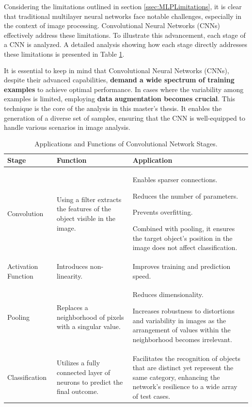 Considering the limitations outlined in section \ref{ssec:MLPLimitations}, it is clear that traditional multilayer neural networks face notable challenges, especially in the context of image processing. Convolutional Neural Networks (CNNs) effectively address these limitations. To illustrate this advancement, each stage of a CNN is analyzed. A detailed analysis showing how each stage directly addresses these limitations is presented in Table \ref{tab:CNNStages}.

It is essential to keep in mind that Convolutional Neural Networks (CNNs), despite their advanced capabilities, \textbf{demand a wide spectrum of training examples} to achieve optimal performance. In cases where the variability among examples is limited, employing \textbf{data augmentation becomes crucial}. This technique is the core of the analysis in this master's thesis. It enables the generation of a diverse set of samples, ensuring that the CNN is well-equipped to handle various scenarios in image analysis.

\begin{table}[H]
    
    \caption{Applications and Functions of Convolutional Network Stages.}
    \centering
    \begin{tabular}{|>{\centering\arraybackslash}m{4cm}|>{\centering\arraybackslash}m{3.9cm}|>{\centering\arraybackslash}m{6.8cm}|}
     
      \hline
     \textbf{Stage} & \textbf{Function} & \textbf{Application}  \\ 
      \hline
      Convolution & Using a filter extracts the features of the object visible in the image. & Enables sparser connections.
      
      Reduces the number of parameters.
      
      Prevents overfitting.
      
      Combined with pooling, it ensures the target object's position in the image does not affect classification.\\ 
      \hline
      Activation Function & Introduces non-linearity. & Improves training and prediction speed. \\

      \hline
      Pooling & Replaces a neighborhood of pixels with a singular value. & Reduces dimensionality. 
      
      Increases robustness to distortions and variability in images as the arrangement of values within the neighborhood becomes irrelevant.\\
      \hline
      Classification & Utilizes a fully connected layer of neurons to predict the final outcome. & Facilitates the recognition of objects that are distinct yet represent the same category, enhancing the network's resilience to a wide array of test cases.\\
      \hline
    
    \end{tabular}
    \label{tab:CNNStages}
\end{table}

